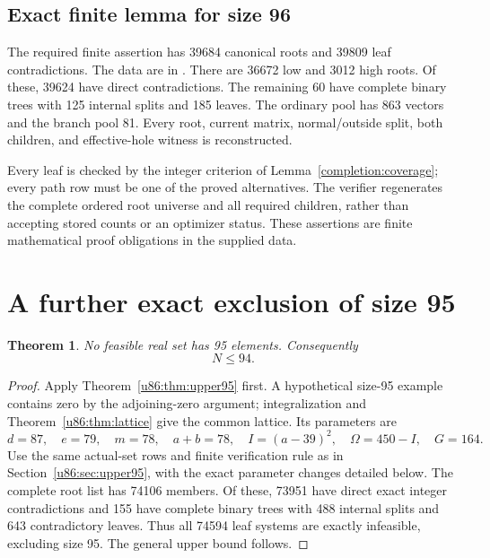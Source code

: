 \documentclass[11pt,a4paper]{article}
\newtheorem{theorem}{Theorem}[section]
\theoremstyle{remark}
\begin{document}
\subsection{Exact finite lemma for size 96}
\label{u86:finite:96}
The required finite assertion has 39684 canonical roots and 39809
leaf contradictions. The data are in .
There are 36672 low and 3012 high roots. Of these, 39624 have direct
contradictions. The remaining 60 have complete binary trees with 125
internal splits and 185 leaves. The ordinary pool has 863 vectors and
the branch pool 81. Every root, current matrix, normal/outside split,
both children, and effective-hole witness is reconstructed.

Every leaf is checked by the integer criterion of
Lemma~\ref{completion:coverage}; every path row must be one of the
proved alternatives. The verifier  regenerates
the complete ordered root universe and all required children, rather than
accepting stored counts or an optimizer status. These assertions are finite
mathematical proof obligations in the supplied data.



\section{A further exact exclusion of size 95}\label{u86:sec:upper94}
\begin{theorem}\label{u86:thm:upper94}
No feasible real set has 95 elements. Consequently
\[
 \boxed{N\le94.}
\]
\end{theorem}
\begin{proof}
Apply Theorem~\ref{u86:thm:upper95} first. A hypothetical size-95 example
contains zero by the adjoining-zero argument; integralization and
Theorem~\ref{u86:thm:lattice} give the common lattice. Its parameters are
\[
 d=87,\quad e=79,\quad m=78,\quad a+b=78,\quad
 I=(a-39)^2,\quad\Omega=450-I,\quad G=164.
\]
Use the same actual-set rows and finite verification rule as in
Section~\ref{u86:sec:upper95}, with the exact parameter changes detailed
below. The complete root list has 74106 members. Of these, 73951 have
direct exact integer contradictions and 155 have complete binary trees
with 488 internal splits and 643 contradictory leaves. Thus all 74594
leaf systems are exactly infeasible, excluding size 95.
The general upper bound follows.
\end{proof}
\end{document}
